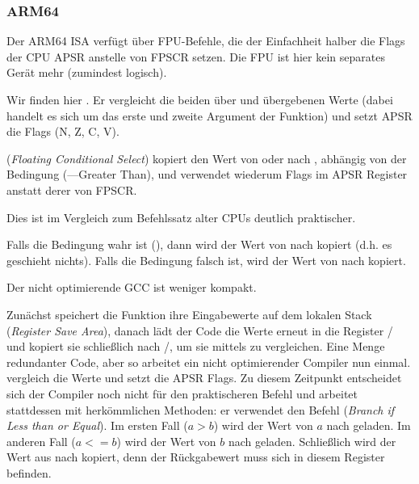 \subsubsection{ARM64}



Der ARM64 \ac{ISA} verfügt über FPU-Befehle, die der Einfachheit halber die Flags der CPU \ac{APSR} anstelle von
\ac{FPSCR} setzen.
Die \ac{FPU} ist hier kein separates Gerät mehr (zumindest logisch).

Wir finden hier . Er vergleicht die beiden über  und  übergebenen Werte (dabei handelt es
sich um das erste und zweite Argument der Funktion) und setzt \ac{APSR} die Flags (N, Z, C, V).

 (\emph{Floating Conditional Select}) kopiert den Wert von  oder  nach , abhängig von
der Bedingung (---Greater Than), und verwendet wiederum Flags im \ac{APSR} Register anstatt derer von
\ac{FPSCR}.

Dies ist im Vergleich zum Befehlssatz alter CPUs deutlich praktischer.

Falls die Bedingung wahr ist (), dann wird der Wert von  nach  kopiert (d.h. es geschieht
nichts).
Falls die Bedingung falsch ist, wird der Wert von  nach  kopiert.



Der nicht optimierende GCC ist weniger kompakt.

Zunächst speichert die Funktion ihre Eingabewerte auf dem lokalen Stack (\emph{Register Save Area}), danach lädt der Code
die Werte erneut in die Register / und kopiert sie schließlich nach /, um sie mittels
 zu vergleichen.
Eine Menge redundanter Code, aber so arbeitet ein nicht optimierender Compiler nun einmal.
 vergleich die Werte und setzt die \ac{APSR} Flags.
Zu diesem Zeitpunkt entscheidet sich der Compiler noch nicht für den praktischeren  Befehl und arbeitet
stattdessen mit herkömmlichen Methoden:
er verwendet den  Befehl (\emph{Branch if Less than or Equal}).
Im ersten Fall ($a>b$) wird der Wert von $a$ nach  geladen. 
Im anderen Fall ($a<=b$) wird der Wert von $b$ nach  geladen.
Schließlich wird der Wert aus  nach  kopiert, denn der Rückgabewert muss sich in diesem Register
befinden.


